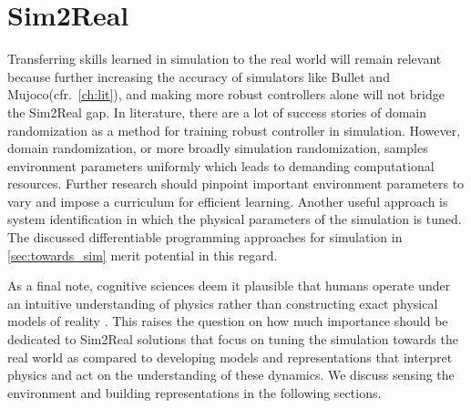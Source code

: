 \documentclass[\home/main.tex]{subfiles}
\begin{document}
\section{Sim2Real}
Transferring skills learned in simulation to the real world will remain relevant because further increasing the accuracy of simulators like Bullet and Mujoco(cfr.\ \cref{ch:lit}), and making more robust controllers alone will not bridge the Sim2Real gap. In literature, there are a lot of success stories of domain randomization as a method for training robust controller in simulation. However, domain randomization, or more broadly simulation randomization, samples environment parameters uniformly which leads to demanding computational resources. Further research should pinpoint important environment parameters to vary and impose a curriculum for efficient learning. Another useful approach is system identification in which the physical parameters of the simulation is tuned. The discussed differentiable programming approaches for simulation in \cref{sec:towards_sim} merit potential in this regard. 

As a final note, cognitive sciences deem it plausible that humans operate under an intuitive understanding of physics rather than constructing exact physical models of reality \autocite{Baillargeon2011}. This raises the question on how much importance should be dedicated to Sim2Real solutions that focus on tuning the simulation towards the real world as compared to developing models and representations that interpret physics and act on the understanding of these dynamics. We discuss sensing the environment and building representations in the following sections.  
\end{document}
